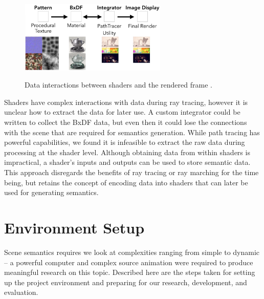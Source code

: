\documentclass[conference]{IEEEtran}
\begin{document}
\begin{figure}[htbp]
\centering
{\includegraphics[width=7cm]{interaction.png}}
\caption{Data interactions between shaders and the rendered frame  \cite{renderman}.}
\label{fig:interaction}
\end{figure}

Shaders have complex interactions with data during ray tracing,
however it is unclear how to extract the data for later use.
A custom integrator could be written to collect the BxDF data, but even then it
could lose the connections with the scene that are required for semantics generation.
While path tracing has powerful capabilities,
we found it is infeasible to extract the raw data during processing
at the shader level.
Although obtaining data from within shaders is impractical,
a shader's inputs and outputs can be used to store semantic data.
This approach disregards the benefits of ray tracing or ray marching for the time being,
but retains the concept of encoding data into shaders that can later be used
for generating semantics.

\section{Environment Setup}
\label{sec:environment}
Scene semantics requires we look at complexities ranging from simple to dynamic --
a powerful computer and complex source animation were required
to produce meaningful research on this topic.
Described here are the steps taken for setting up the project
environment and preparing for our research, development, and evaluation.

\end{document}
